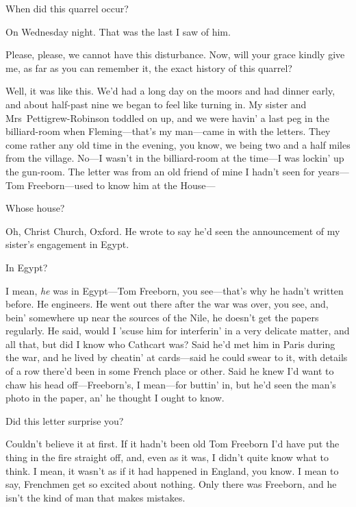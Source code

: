 \begin{dialogue}
 When did this quarrel occur?

 On Wednesday night. That was the last I saw of him. 

 Please, please, we cannot have this disturbance. Now, will your grace kindly give me, as far as you can remember it, the exact history of this quarrel?

 Well, it was like this. We'd had a long day on the moors and had dinner early, and about half-past nine we began to feel like turning in. My sister and Mrs~Pettigrew-Robinson toddled on up, and we were havin' a last peg in the billiard-room when Fleming—that's my man—came in with the letters. They come rather any old time in the evening, you know, we being two and a half miles from the village.  No—I wasn't in the billiard-room at the time—I was lockin' up the gun-room. The letter was from an old friend of mine I hadn't seen for years—Tom Freeborn—used to know him at the House—

 Whose house?

 Oh, Christ Church, Oxford. He wrote to say he'd seen the announcement of my sister's engagement in Egypt.

 In Egypt?

 I mean, \textit{he} was in Egypt—Tom Freeborn, you see—that's why he hadn't written before. He engineers. He went out there after the war was over, you see, and, bein' somewhere up near the sources of the Nile, he doesn't get the papers regularly. He said, would I 'scuse him for interferin' in a very delicate matter, and all that, but did I know who Cathcart was? Said he'd met him in Paris during the war, and he lived by cheatin' at cards—said he could swear to it, with details of a row there'd been in some French place or other. Said he knew I'd want to chaw his head off—Freeborn's, I mean—for buttin' in, but he'd seen the man's photo in the paper, an' he thought I ought to know.

 Did this letter surprise you?

 Couldn't believe it at first. If it hadn't been old Tom Freeborn I'd have put the thing in the fire straight off, and, even as it was, I didn't quite know what to think. I mean, it wasn't as if it had happened in England, you know. I mean to say, Frenchmen get so excited about nothing. Only there was Freeborn, and he isn't the kind of man that makes mistakes.


\end{dialogue}
